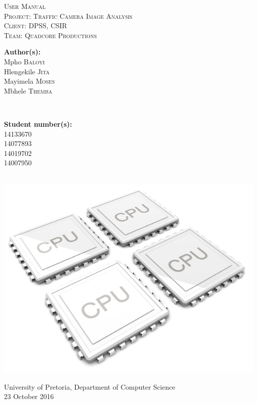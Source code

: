 \documentclass[a4paper,12pt]{article}
\begin{document}
\begin{titlepage}
\center

\textsc{\LARGE User Manual}\\[1.5cm]
\textsc{\Large Project: Traffic Camera Image Analysis}\\[1.5cm]
\textsc{\large Client: DPSS, CSIR}\\[0.5cm]
\textsc{\large Team: Quadcore Productions}\\[0.5cm]

\begin{minipage}{0.4\textwidth}
\begin{flushleft} \large
\textbf{Author(s):}\\
Mpho \textsc{Baloyi}\\
Hlengekile \textsc{Jita}\\
Mayimela \textsc{Moses}\\
Mbhele \textsc{Themba}\\
\end{flushleft}
\end{minipage}
~
\begin{minipage}{0.4\textwidth}
\begin{flushright} \large
\textbf{Student number(s):} \\
14133670\\ %
14077893\\
14019702\\
14007950\\
\end{flushright}
\end{minipage}\\

\includegraphics[width=\textwidth]{2012-quad-core-phones.jpg}

{\large University of Pretoria, Department of Computer Science}\\

{\large 23 October 2016}\\[3cm]

\vfil

\end{titlepage}
\end{document}
